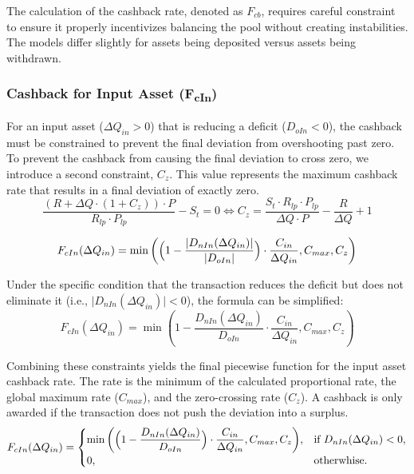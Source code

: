 The calculation of the cashback rate, denoted as $F_{cb}$, requires careful constraint to ensure it properly incentivizes balancing the pool without creating instabilities. The models differ slightly for assets being deposited versus assets being withdrawn.

\subsubsection*{Cashback for Input Asset (F\textsubscript{cIn})}

For an input asset ($\Delta Q_{in} > 0$) that is reducing a deficit ($D_{oIn} < 0$), the cashback must be constrained to prevent the final deviation from overshooting past zero.
To prevent the cashback from causing the final deviation to cross zero, we introduce a second constraint, $C_z$. This value represents the maximum cashback rate that results in a final deviation of exactly zero.
\begin{equation}
	\label{eq:cashback_constraint for_amount_in}
	\frac{(R + \Delta Q \cdot (1 + C_z)) \cdot P}{R_{lp} \cdot P_{lp}} - S_t = 0 \iff C_z = \frac{S_t \cdot R_{lp} \cdot P_{lp}}{\Delta Q \cdot P} - \frac{R}{\Delta Q} + 1
\end{equation}

\begin{equation}
	\label{eq:invariant_swap_cashback_in_function}
	F_{cIn}(\Delta Q_{in}) = \min\left(\Bigl(1 - \frac{\lvert D_{nIn}(\Delta Q_{in})  \rvert}{ \lvert D_{oIn} \rvert}\Bigr) \cdot \frac{C_{in}}{\Delta Q_{in}}, C_{max}, C_z\right)
\end{equation}

Under the specific condition that the transaction reduces the deficit but does not eliminate it (i.e., $\lvert D_{nIn}(\Delta Q_{in}) \rvert < 0 $), the formula can be simplified:
\begin{equation}
	\label{eq:invariant_swap_cashback_in_function_simplified}
	F_{cIn}(\Delta Q_{in}) = \min\left(1 -\frac{D_{nIn}(\Delta Q_{in})}{ D_{oIn}} \cdot \frac{C_{in}}{\Delta Q_{in}}, C_{max}, C_z\right)
\end{equation}


Combining these constraints yields the final piecewise function for the input asset cashback rate. The rate is the minimum of the calculated proportional rate, the global maximum rate ($C_{max}$), and the zero-crossing rate ($C_z$). A cashback is only awarded if the transaction does not push the deviation into a surplus.
\begin{equation}
	\label{eq:swap_invariant_cashback_in_function_final}
	F_{cIn}(\Delta Q_{in}) = \begin{cases}
		\begin{aligned} \min\left(  \Bigl(1- \frac{D_{nIn}(\Delta Q_{in})}{ D_{oIn}} \Bigr) \cdot \frac{C_{in}}{\Delta Q_{in}}, C_{max}, C_z\right) \end{aligned}, & \text{if } D_{nIn}(\Delta Q_{in}) < 0, \\
		0, & \text{otherwhise.}
	\end{cases}	
\end{equation}

